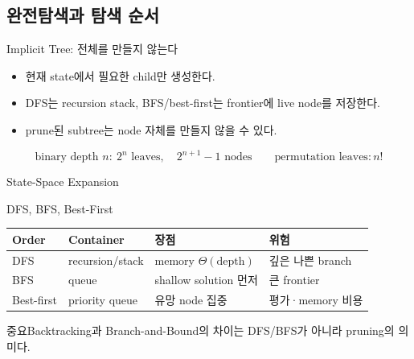 \subsection{완전탐색과 탐색 순서}
\begin{frame}{Implicit Tree: 전체를 만들지 않는다}
\begin{itemize}
\item 현재 state에서 필요한 child만 생성한다.
\item DFS는 recursion stack, BFS/best-first는 frontier에 live node를 저장한다.
\item prune된 subtree는 node 자체를 만들지 않을 수 있다.
\end{itemize}
\[
\text{binary depth }n:\ 2^n\text{ leaves},\quad 2^{n+1}-1\text{ nodes}
\qquad
\text{permutation leaves}:n!
\]
\end{frame}
\begin{frame}{State-Space Expansion}
\centering{}
\end{frame}
\begin{frame}{DFS, BFS, Best-First}
\small
\begin{tabular}{llll}\toprule
Order&Container&장점&위험\\\midrule
DFS&recursion/stack&memory \(\Theta(\text{depth})\)&깊은 나쁜 branch\\
BFS&queue&shallow solution 먼저&큰 frontier\\
Best-first&priority queue&유망 node 집중&평가·memory 비용\\\bottomrule
\end{tabular}
\begin{block}{중요}Backtracking과 Branch-and-Bound의 차이는 DFS/BFS가 아니라 pruning의 의미다.\end{block}
\end{frame}
